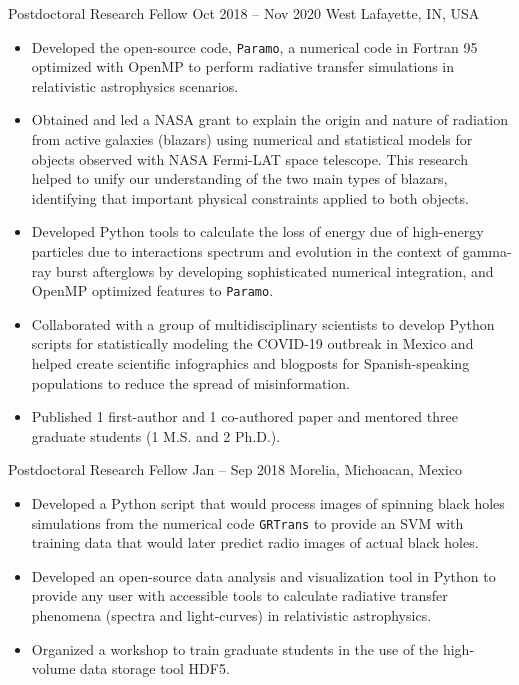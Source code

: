 \cventry{}%
{\Purdue}%
{Postdoctoral Research Fellow}%
{Oct 2018 -- Nov 2020}%
{West Lafayette, IN, USA}%
{%
\begin{itemize}
    \item Developed the open-source code, \texttt{Paramo}, a numerical code in Fortran 95 optimized with OpenMP to perform radiative transfer simulations in relativistic astrophysics scenarios.
    \item Obtained and led a NASA grant to explain the origin and nature of radiation from active galaxies (blazars) using  numerical and statistical models for objects observed with NASA Fermi-LAT space telescope. This research helped to unify our understanding of the two main types of blazars, identifying that important physical constraints applied to both objects.
    \item Developed Python tools to calculate the loss of energy due of high-energy particles due to interactions spectrum and evolution in the context of gamma-ray burst afterglows by developing sophisticated numerical integration, and OpenMP optimized features to \texttt{Paramo}.
    \item Collaborated with a group of multidisciplinary scientists to develop Python scripts for statistically modeling the COVID-19 outbreak in Mexico and helped create scientific infographics and blogposts for Spanish-speaking populations to reduce the spread of misinformation.
    \item Published 1 first-author and 1 co-authored paper and mentored three graduate students (1 M.S. and 2 Ph.D.).
\end{itemize}
}
\cventry{}%
{\UMSNHes}%
{Postdoctoral Research Fellow}%
{Jan -- Sep 2018}%
{Morelia, Michoacan, Mexico}%
{%
\begin{itemize}
    \item Developed a Python script that would process images of spinning black holes simulations from  the numerical code \texttt{GRTrans} to provide an SVM with training data that would later predict radio images of actual black holes.
    \item Developed an open-source data analysis and visualization tool in Python to provide any user with accessible tools to calculate radiative transfer phenomena (spectra and light-curves) in relativistic astrophysics.
    \item Organized a workshop to train graduate students in the use of the high-volume data storage tool HDF5.
\end{itemize}
}
